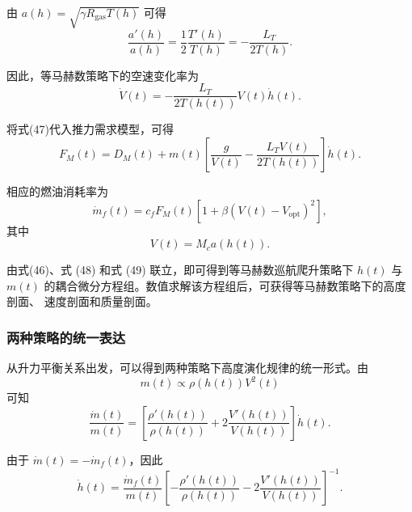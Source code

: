 \documentclass[withoutpreface,bwprint]{cumcmthesis} %
\begin{document}
由 $a(h)=\sqrt{\gamma R_{\mathrm{gas}}T(h)}$ 可得
\begin{equation}
    \frac{a'(h)}{a(h)}
    =
    \frac{1}{2}\frac{T'(h)}{T(h)}
    =
    -\frac{L_T}{2T(h)}.
    \label{eq:constant_mach_adot}
\end{equation}

因此，等马赫数策略下的空速变化率为
\begin{equation}
    \dot V(t)
    =
    -
    \frac{L_T}{2T(h(t))}
    V(t)\dot h(t).
    \label{eq:constant_mach_Vdot_final}
\end{equation}

将式(47)代入推力需求模型，可得
\begin{equation}
    F_M(t)
    =
    D_M(t)
    +
    m(t)
    \left[
    \frac{g}{V(t)}
    -
    \frac{L_TV(t)}{2T(h(t))}
    \right]
    \dot h(t).
    \label{eq:constant_mach_thrust}
\end{equation}

相应的燃油消耗率为
\begin{equation}
    \dot m_f(t)
    =
    c_fF_M(t)
    \left[
    1+\beta\left(V(t)-V_{\mathrm{opt}}\right)^2
    \right],
    \label{eq:constant_mach_fuel}
\end{equation}
其中
\begin{equation}
    V(t)=M_ca(h(t)).
    \label{eq:constant_mach_speed}
\end{equation}

由式(46)、式 (48)
和式 (49) 联立，即可得到等马赫数巡航爬升策略下
$h(t)$ 与 $m(t)$ 的耦合微分方程组。数值求解该方程组后，可获得等马赫数策略下的高度剖面、
速度剖面和质量剖面。

\subsubsection{两种策略的统一表达}

从升力平衡关系出发，可以得到两种策略下高度演化规律的统一形式。由
\begin{equation}
    m(t)
    \propto
    \rho(h(t))V^2(t)
\end{equation}
可知
\begin{equation}
    \frac{\dot m(t)}{m(t)}
    =
    \left[
    \frac{\rho'(h(t))}{\rho(h(t))}
    +
    2\frac{V'(h(t))}{V(h(t))}
    \right]\dot h(t).
    \label{eq:unified_derivative}
\end{equation}

由于 $\dot m(t)=-\dot m_f(t)$，因此
\begin{equation}
    \dot h(t)
    =
    \frac{\dot m_f(t)}{m(t)}
    \left[
    -\frac{\rho'(h(t))}{\rho(h(t))}
    -
    2\frac{V'(h(t))}{V(h(t))}
    \right]^{-1}.
    \label{eq:unified_hdot}
\end{equation}
\end{document}
